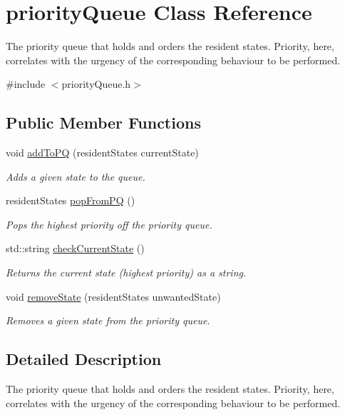 \hypertarget{classpriorityQueue}{\section{priority\-Queue Class Reference}
\label{classpriorityQueue}
}


The priority queue that holds and orders the resident states. Priority, here, correlates with the urgency of the corresponding behaviour to be performed.  




{\ttfamily \#include $<$priority\-Queue.\-h$>$}

\subsection*{Public Member Functions}
\begin{DoxyCompactItemize}
\item 
void \hyperlink{classpriorityQueue_a58658233e429bf3666dc4eb5300012c4}{add\-To\-P\-Q} (resident\-States current\-State)
\begin{DoxyCompactList}\small\item\em Adds a given state to the queue. \end{DoxyCompactList}\item 
resident\-States \hyperlink{classpriorityQueue_a78d5b85232d7303cabc49c4fac41a0ec}{pop\-From\-P\-Q} ()
\begin{DoxyCompactList}\small\item\em Pops the highest priority off the priority queue. \end{DoxyCompactList}\item 
std\-::string \hyperlink{classpriorityQueue_a1d4923612653d4b3f810b7451d21004d}{check\-Current\-State} ()
\begin{DoxyCompactList}\small\item\em Returns the current state (highest priority) as a string. \end{DoxyCompactList}\item 
void \hyperlink{classpriorityQueue_a448eafd83ae7742c21b8f70b078ae48b}{remove\-State} (resident\-States unwanted\-State)
\begin{DoxyCompactList}\small\item\em Removes a given state from the priority queue. \end{DoxyCompactList}\end{DoxyCompactItemize}


\subsection{Detailed Description}
The priority queue that holds and orders the resident states. Priority, here, correlates with the urgency of the corresponding behaviour to be performed. 

